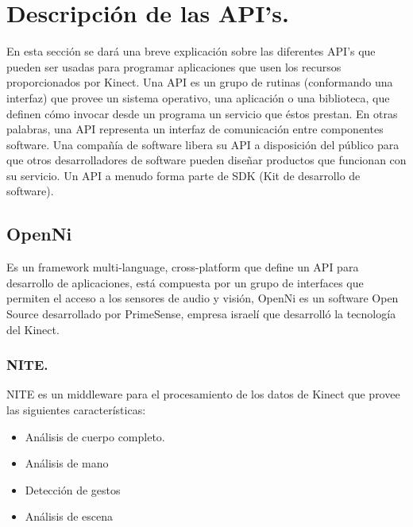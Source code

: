 \documentclass[11pt,a4paper]{article}
\begin{document}
\section{Descripción de las API's.}
En esta sección se dará una breve explicación sobre las diferentes API's que pueden ser usadas para programar aplicaciones que usen los recursos proporcionados por Kinect. \newline
Una API es un grupo de rutinas (conformando una interfaz) que provee un sistema operativo, una aplicación o una biblioteca, que definen cómo invocar desde  un programa un servicio que éstos prestan. En otras palabras, una API representa un interfaz de comunicación entre componentes software. Una compañía de software libera su API a disposición del público para que otros desarrolladores de software pueden diseñar productos que funcionan con su servicio. Un API a menudo forma parte de SDK (Kit de desarrollo de software)\cite{Alegsa API}.

\subsection{OpenNi}
Es un framework  multi-language, cross-platform que define un API para desarrollo de aplicaciones, está compuesta por un grupo de interfaces que permiten el acceso a los sensores de audio y visión, OpenNi es un software Open Source desarrollado por PrimeSense, empresa israelí que desarrolló la tecnología del Kinect.

\subsubsection{NITE.}
NITE es un middleware  para el procesamiento de los datos de Kinect que provee las siguientes características:
\begin{itemize}
\item Análisis de cuerpo completo.
\item Análisis de mano
\item Detección de gestos 
\item Análisis de escena 
\end{itemize} 
\end{document}

